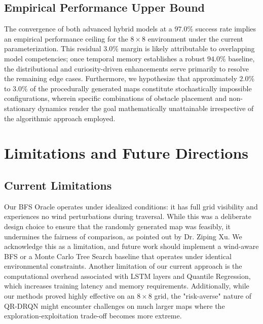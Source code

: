 \documentclass{article}
\begin{document}
\subsection{Empirical Performance Upper Bound}
The convergence of both advanced hybrid models at a $97.0\%$ success rate implies an empirical performance ceiling for the $8\times8$ environment under the current parameterization. This residual $3.0\%$ margin is likely attributable to overlapping model competencies; once temporal memory establishes a robust $94.0\%$ baseline, the distributional and curiosity-driven enhancements serve primarily to resolve the remaining edge cases. Furthermore, we hypothesize that approximately $2.0\%$ to $3.0\%$ of the procedurally generated maps constitute stochastically impossible configurations, wherein specific combinations of obstacle placement and non-stationary dynamics render the goal mathematically unattainable irrespective of the algorithmic approach employed.


\section{Limitations and Future Directions}

\subsection{Current Limitations}
Our BFS Oracle operates under idealized conditions: it has full grid visibility and experiences no wind perturbations during traversal. While this was a deliberate design choice to ensure that the randomly generated map was feasibly, it undermines the fairness of comparison, as pointed out by Dr. Ziping Xu. We acknowledge this as a limitation, and future work should implement a wind-aware BFS or a Monte Carlo Tree Search baseline that operates under identical environmental constraints. Another limitation of our current approach is the computational overhead associated with LSTM layers and Quantile Regression, which increases training latency and memory requirements. Additionally, while our methods proved highly effective on an $8\times8$ grid, the "risk-averse" nature of QR-DRQN might encounter challenges on much larger maps where the exploration-exploitation trade-off becomes more extreme.
\end{document}
